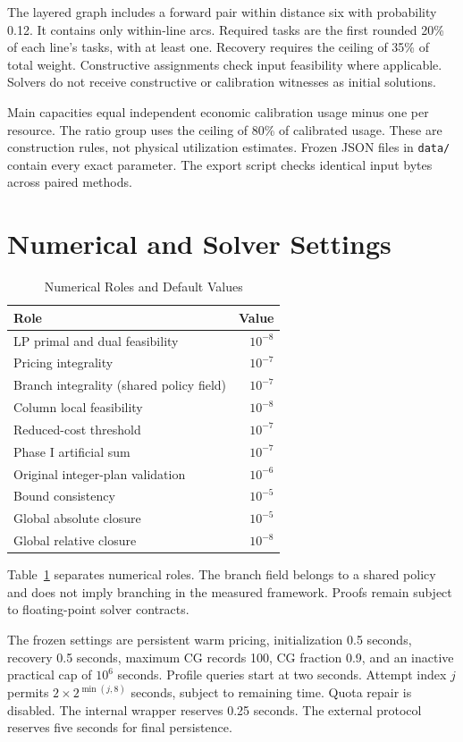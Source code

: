 \documentclass[letterpaper,journal]{IEEEtran}
\begin{document}
The layered graph includes a forward pair within distance six with probability 0.12. It contains only within-line arcs. Required tasks are the first rounded 20\% of each line's tasks, with at least one. Recovery requires the ceiling of 35\% of total weight. Constructive assignments check input feasibility where applicable. Solvers do not receive constructive or calibration witnesses as initial solutions.

Main capacities equal independent economic calibration usage minus one per resource. The ratio group uses the ceiling of 80\% of calibrated usage. These are construction rules, not physical utilization estimates. Frozen JSON files in \texttt{data/} contain every exact parameter. The export script checks identical input bytes across paired methods.

\section{Numerical and Solver Settings}
\begin{table}[!t]\centering\small
\caption{Numerical Roles and Default Values}\label{tab:tol}
\begin{tabular}{lr}\toprule
Role & Value\\\midrule
LP primal and dual feasibility & $10^{-8}$\\
Pricing integrality & $10^{-7}$\\
Branch integrality (shared policy field) & $10^{-7}$\\
Column local feasibility & $10^{-8}$\\
Reduced-cost threshold & $10^{-7}$\\
Phase I artificial sum & $10^{-7}$\\
Original integer-plan validation & $10^{-6}$\\
Bound consistency & $10^{-5}$\\
Global absolute closure & $10^{-5}$\\
Global relative closure & $10^{-8}$\\\bottomrule
\end{tabular}
\end{table}
Table~\ref{tab:tol} separates numerical roles. The branch field belongs to a shared policy and does not imply branching in the measured framework. Proofs remain subject to floating-point solver contracts.

The frozen settings are persistent warm pricing, initialization 0.5 seconds, recovery 0.5 seconds, maximum CG records 100, CG fraction 0.9, and an inactive practical cap of $10^6$ seconds. Profile queries start at two seconds. Attempt index $j$ permits $2\times2^{\min(j,8)}$ seconds, subject to remaining time. Quota repair is disabled. The internal wrapper reserves 0.25 seconds. The external protocol reserves five seconds for final persistence.
\end{document}
